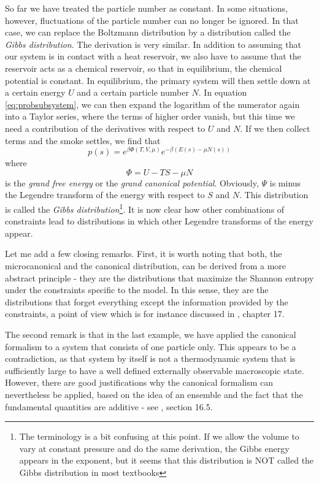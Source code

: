 \documentclass[a4paper, draft]{report}
\numberwithin{section}{chapter}
\numberwithin{equation}{chapter}
\theoremstyle{own}
\theoremstyle{remark}
\begin{document}
So far we have treated the particle number as constant. In some situations, however, fluctuations of the particle number can no longer be ignored. In that case, we can replace the Boltzmann distribution by a distribution called the {\em Gibbs distribution}. The derivation is very similar. In addition to assuming that our system is in contact with a heat reservoir, we also have to assume that the reservoir acts as a chemical reservoir, so that in equilibrium, the chemical potential is constant. In equilibrium, the primary system will then settle down at a certain energy $U$ and a certain particle number $N$. In equation \ref{eq:probsubsystem}, we can then expand the logarithm of the numerator again into a Taylor series, where the terms of higher order vanish, but this time we need a contribution of the derivatives with respect to $U$ and $N$. If we then collect terms and the smoke settles, we find that 
$$
p(s) = e^{\beta \Phi(T,V,\mu)} e^{-\beta(E(s) - \mu N(s))}
$$
where 
$$
\Phi = U - TS - \mu N
$$
is the {\em grand free energy} or the {\em grand canonical potential}. Obviously, $\Psi$ is minus the Legendre transform of the energy with respect to $S$ and $N$. This distribution is called the 
{\em Gibbs distribution}\footnote{The terminology is a bit confusing at this point. If we allow the volume to vary at constant pressure and do the same derivation, the Gibbs energy appears in the exponent, but it seems that this distribution is NOT called the Gibbs distribution in most textbooks}. It is now clear how other combinations of constraints lead to distributions in which other Legendre transforms of the energy appear. 

Let me add a few closing remarks. First, it is worth noting that both, the microcanonical and the canonical distribution, can be derived from a more abstract principle - they are the distributions that maximize the Shannon entropy under the constraints specific to the model. In this sense, they are the distributions that forget everything except the information provided by the constraints, a point of view which is for instance discussed in \cite{Callen}, chapter 17.

The second remark is that in the last example, we have applied the canonical formalism to a system that consists of one particle only. This appears to be a contradiction, as that system by itself is not a thermodynamic system that is sufficiently large to have a well defined externally observable macroscopic state. However, there are good justifications why the canonical formalism can nevertheless be applied, based on the idea of an ensemble and the fact that the fundamental quantities are additive - see \cite{Callen}, section 16.5.
\end{document}
